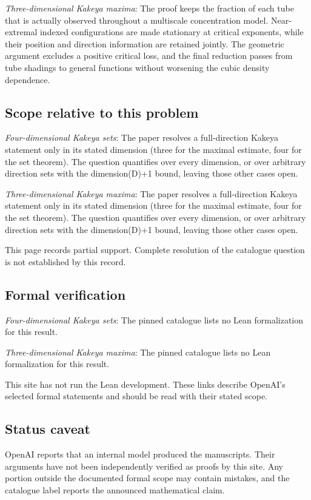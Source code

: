 \documentclass[11pt]{article}
\begin{document}
\textit{Three-dimensional Kakeya maxima}: The proof keeps the fraction of each tube that is actually observed throughout a multiscale concentration model. Near-extremal indexed configurations are made stationary at critical exponents, while their position and direction information are retained jointly. The geometric argument excludes a positive critical loss, and the final reduction passes from tube shadings to general functions without worsening the cubic density dependence.

\subsection{Scope relative to this problem}
\textit{Four-dimensional Kakeya sets}: The paper resolves a full-direction Kakeya statement only in its stated dimension (three for the maximal estimate, four for the set theorem). The question quantifies over every dimension, or over arbitrary direction sets with the dimension(D)+1 bound, leaving those other cases open.

\textit{Three-dimensional Kakeya maxima}: The paper resolves a full-direction Kakeya statement only in its stated dimension (three for the maximal estimate, four for the set theorem). The question quantifies over every dimension, or over arbitrary direction sets with the dimension(D)+1 bound, leaving those other cases open.

This page records partial support. Complete resolution of the catalogue question is not established by this record.

\subsection{Formal verification}
\textit{Four-dimensional Kakeya sets}: The pinned catalogue lists no Lean formalization for this result.

\textit{Three-dimensional Kakeya maxima}: The pinned catalogue lists no Lean formalization for this result.

This site has not run the Lean development. These links describe OpenAI’s selected formal statements and should be read with their stated scope.

\subsection{Status caveat}
OpenAI reports that an internal model produced the manuscripts. Their arguments have not been independently verified as proofs by this site. Any portion outside the documented formal scope may contain mistakes, and the catalogue label reports the announced mathematical claim.
\end{document}
